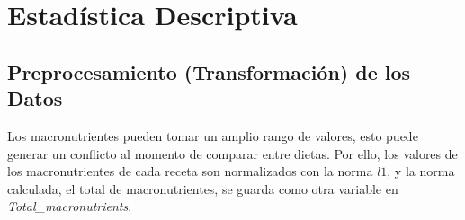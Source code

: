 \documentclass[12pt,a4paper]{article}
\begin{document}
    \section{Estadística Descriptiva}\label{sec:eda}
    {
        \subsection{Preprocesamiento (Transformación) de los Datos}\label{subsec:trans_datos}
        {
            Los macronutrientes pueden tomar un amplio rango 
            de valores, esto puede generar un conflicto al momento de comparar 
            entre dietas. 
            Por ello, los valores de los macronutrientes de cada receta son 
            normalizados con la norma $l1$, y la norma calculada, el total de macronutrientes,
            se guarda como otra variable en \emph{Total\_macronutrients}.

}}
\end{document}
